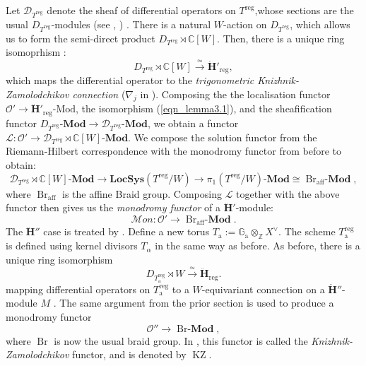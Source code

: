 \documentclass[a4paper]{report}
\theoremstyle{theorem}
\theoremstyle{definition}
\theoremstyle{remark}
\theoremstyle{proposition}
\theoremstyle{conjecture}
\theoremstyle{lemma}
\theoremstyle{corollary}
\theoremstyle{exercise}
\theoremstyle{example}
\newcommand{\C}{\mathbb{C}}
\newcommand{\mcal}{\mathcal}
\newcommand{\on}{\operatorname}
\begin{document}
  Let $\mcal{D}_{T^{\on{reg}}}$ denote the sheaf of differential operators on $T^{\on{reg}}$,whose 
  sections are the usual $D_{T^{\on{reg}}}$-modules (see \cite{hot98}, \cite{eti17}) . 
  There is a natural 
  $W$-action on $D_{T^{\on{reg}}}$, which allows us to form the semi-direct product
  $D_{T^{\on{reg}}} \rtimes \C[W]$.
  Then, there is a unique ring isomoprhism \cite[Lemma 3.1(ii)]{vv04}: 
  \begin{equation}\label{eqn_lemma3.1}
      D_{T^{\on{reg}}} \rtimes \C[W] \stackrel{\simeq}{\longrightarrow} \mathbf{\ddot{\mathbf{H}}}'_{\on{reg}},
  \end{equation}
  which maps the differential operator to the \emph{trigonometric Knizhnik-Zamolodchikov connection} ($\nabla_j$ in \cite[Lemma 3.1(ii)]{vv04}). 
  Composing the the localisation functor $\mcal{O}' \to \text{$\mathbf{\ddot{\mathbf{H}}}'_{\on{reg}}$-Mod}$, the isomorphism (\ref{eqn_lemma3.1}), and the sheafification
  functor $\textbf{$D_{T^{\on{reg}}}$-Mod} \to \textbf{$\mcal{D}_{T^{\on{reg}}}$-Mod}$, we obtain a functor 
  $\mcal{L} : \mcal{O}' \to \textbf{$\mcal{D}_{T^{\on{reg}}} \rtimes \C[W]$-Mod}$.
  We compose the solution functor from the Riemann-Hilbert correspondence
  with the monodromy functor from before to obtain: 
  $$\textbf{$\mcal{D}_{T^{\on{reg}}} \rtimes \C[W]$-Mod} \longrightarrow
  \mathbf{LocSys}(T^{\on{reg}}/W) \longrightarrow \textbf{$\pi_1(T^{\on{reg}}/W)$-Mod} \cong \textbf{$\on{Br}_{\on{aff}}$-Mod},$$
  where $\on{Br}_{\on{aff}}$ is the affine Braid group. 
  Composing $\mcal{L}$ together with the above functor then gives us the 
  \emph{monodromy functor}
  of a $\mathbf{\ddot{\mathbf{H}}}'$-module: $$\mcal{M}on : \mcal{O}' \longrightarrow \textbf{$\on{Br}_{\on{aff}}$-Mod}.$$
  The $\mathbf{\ddot{\mathbf{H}}}''$ case is treated by \cite{ggor03}.
  Define a new torus $T_{\on{a}} := \mathbb{G}_{\on{a}} \otimes_\mathbb{Z} X^\vee$. 
  The scheme $T_{\on{a}}^{\on{reg}}$ is defined using 
  kernel divisors $T_\alpha$ in the same way as before. As before, there is a unique 
  ring isomorphism \cite[Theorem 5.6]{ggor03} 
  $$D_{T_{\on{a}}^{\on{reg}}} \rtimes W \stackrel{\simeq}{\longrightarrow} \mathbf{\ddot{\mathbf{H}}}_{\on{reg}}.$$ 
  mapping differential operators on $T_{\on{a}}^{\on{reg}}$ to a $W$-equivariant
  connection on a $\mathbf{\ddot{\mathbf{H}}}''$-module $M$ \cite[Proposition 5.7]{ggor03}.
  The same argument from the prior section is used to produce a monodromy functor
  $$\mcal{O}'' \longrightarrow \textbf{$\on{Br}$-Mod},$$
  where $\on{Br}$ is now the usual braid group. In \cite{ggor03}, this functor
  is called the \emph{Knizhnik-Zamolodchikov} functor, and is denoted by $\on{KZ}$.
  
\end{document}
